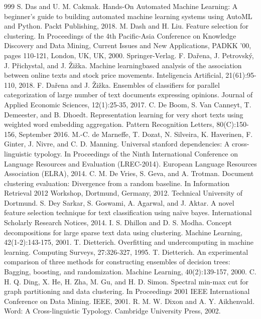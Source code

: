 \documentclass[11pt,openany,executivepaper]{book}
\begin{document}
\begin{thebibliography}{999}
 S. Das and U. M. Cakmak. Hands-On Automated Machine Learning: A beginner's guide to building automated machine learning systems using AutoML and Python. Packt Publishing, 2018.
 M. Dash and H. Liu. Feature selection for clustering. In Proceedings of the 4th Pacific-Asia Conference on Knowledge Discovery and Data Mining, Current Issues and New Applications, PADKK '00, pages 110-121, London, UK, UK, 2000. Springer-Verlag.
 F. Dařena, J. Petrovský, J. Přichystal, and J. Žižka. Machine learningbased analysis of the association between online texts and stock price movements. Inteligencia Artificial, 21(61):95-110, 2018.
 F. Dařena and J. Žižka. Ensembles of classifiers for parallel categorization of large number of text documents expressing opinions. Journal of Applied Economic Sciences, 12(1):25-35, 2017.
 C. De Boom, S. Van Canneyt, T. Demeester, and B. Dhoedt. Representation learning for very short texts using weighted word embedding aggregation. Pattern Recognition Letters, 80(C):150-156, September 2016.
 M.-C. de Marneffe, T. Dozat, N. Silveira, K. Haverinen, F. Ginter, J. Nivre, and C. D. Manning. Universal stanford dependencies: A cross-linguistic typology. In Proceedings of the Ninth International Conference on Language Resources and Evaluation (LREC-2014). European Language Resources Association (ELRA), 2014.
 C. M. De Vries, S. Geva, and A. Trotman. Document clustering evaluation: Divergence from a random baseline. In Information Retrieval 2012 Workshop, Dortmund, Germany, 2012. Technical University of Dortmund.
 S. Dey Sarkar, S. Goswami, A. Agarwal, and J. Aktar. A novel feature selection technique for text classification using naïve bayes. International Scholarly Research Notices, 2014.
 I. S. Dhillon and D. S. Modha. Concept decompositions for large sparse text data using clustering. Machine Learning, 42(1-2):143-175, 2001.
 T. Dietterich. Overfitting and undercomputing in machine learning. Computing Surveys, 27:326-327, 1995.
 T. Dietterich. An experimental comparison of three methods for constructing ensembles of decision trees: Bagging, boosting, and randomization. Machine Learning, 40(2):139-157, 2000.
 C. H. Q. Ding, X. He, H. Zha, M. Gu, and H. D. Simon. Spectral min-max cut for graph partitioning and data clustering. In Proceedings 2001 IEEE International Conference on Data Mining. IEEE, 2001.
 R. M. W. Dixon and A. Y. Aikhenvald. Word: A Cross-linguistic Typology. Cambridge University Press, 2002.

\end{thebibliography}
\end{document}
